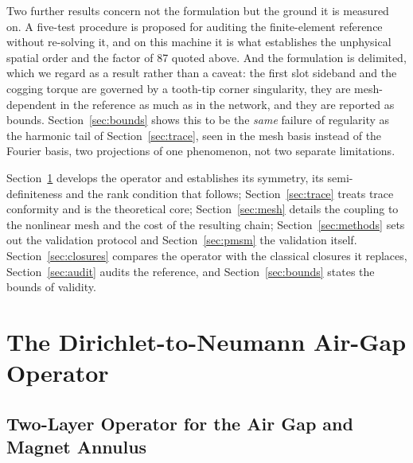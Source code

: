 \documentclass[10pt,a4paper,twocolumn]{article}
\theoremstyle{plain}
\theoremstyle{remark}
\begin{document}
Two further results concern not the formulation but the ground it is
measured on. A five-test procedure is proposed for auditing the
finite-element reference without re-solving it, and on this machine it
is what establishes the unphysical spatial order and the factor of 87
quoted above. And the formulation is delimited, which we regard as a
result rather than a caveat: the first slot sideband and the cogging
torque are governed by a tooth-tip corner singularity, they are
mesh-dependent in the reference as much as in the network, and they are
reported as bounds. Section~\ref{sec:bounds} shows this to be the
\emph{same} failure of regularity as the harmonic tail of
Section~\ref{sec:trace}, seen in the mesh basis instead of the Fourier
basis, two projections of one phenomenon, not two separate
limitations.

Section~\ref{sec:dtn} develops the operator and establishes its
symmetry, its semi-definiteness and the rank condition that follows;
Section~\ref{sec:trace} treats trace conformity and is the theoretical
core; Section~\ref{sec:mesh} details the coupling to the nonlinear mesh
and the cost of the resulting chain; Section~\ref{sec:methods} sets out
the validation protocol and Section~\ref{sec:pmsm} the validation
itself. Section~\ref{sec:closures} compares the operator with the
classical closures it replaces, Section~\ref{sec:audit} audits the
reference, and Section~\ref{sec:bounds} states the bounds of validity.



\section{The Dirichlet-to-Neumann Air-Gap Operator}
\label{sec:dtn}



\subsection{Two-Layer Operator for the Air Gap and Magnet Annulus}
\label{sub:twolayer}
\end{document}
